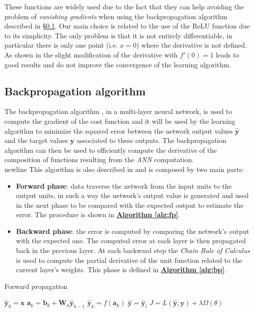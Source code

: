 These functions are widely used due to the fact that they can help avoiding the problem of \textit{vanishing gradients} when using the backpropagation algorithm described in \S\ref{backprop}. Our main choice is related to the use of the ReLU function due to its simplicity. The only problem is that it is not entirely differentiable, in particular there is only one point (i.e. $x=0$) where the derivative is not defined. As shown in  the slight modification of the derivative with $f'(0) = 1$ leads to good results and do not improve the convergence of the learning algorithm.

\subsection{Backpropagation algorithm}
\label{backprop}
The backpropagation algorithm \parencite[see][Chap. 6.5]{bengio}, in a multi-layer neural network, is used to compute the gradient of the cost function and it will be used by the learning algorithm to minimize the squared error between the network output values $\hat{\textbf{y}}$ and the target values $\textbf{y}$ associated to these outputs. The backpropagation algorithm can then be used to efficiently compute the derivative of the composition of functions resulting from the \textit{ANN} computation.\\newline
This algorithm is also described in \cite{MLmitchell} and is composed by two main parts:
\begin{itemize}
    \item \textbf{Forward phase}: data traverse the network from the input units to the output units, in such a way the network's output value is generated and used in the next phase to be compared with the expected output to estimate the error. The procedure is shown in \hyperref[alg:fp]{\textbf{Algorithm \ref{alg:fp}}}.
    \item \textbf{Backward phase}: the error is computed by comparing the network's output with the expected one. The computed error at each layer is then propagated back in the previous layer. At each backward step the \textit{Chain Rule of Calculus} is used to compute the partial derivative of the unit function related to the current layer's weights. This phase is defined in \hyperref[alg:bp]{\textbf{Algorithm \ref{alg:bp}}}.
\end{itemize}

\begin{algorithm}[H]
	\caption{Forward propagation}
	\label{alg:fp}
	\begin{algorithmic}[1]
		\State $\mathbf{\hat{y}}_{0} = \mathbf{x}$
		\State $\mathbf{a}_{k} = \mathbf{b}_{k} + \mathbf{W}_{k}\mathbf{\hat{y}}_{k - 1}$
		\State $\mathbf{\hat{y}}_{k} = f(\mathbf{a}_{k})$
		\EndFor
		\State $\mathbf{\hat{y}} = \mathbf{\hat{y}}_{l}$
		\State $J = L(\mathbf{\hat{y}}, \mathbf{y}) + \lambda \Omega(\theta)$
		\EndProcedure
	\end{algorithmic}
\end{algorithm}

